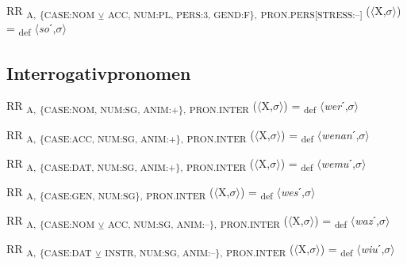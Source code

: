 {\begin{exe}
 RR \textsubscript{A,} \textsubscript{\{CASE:NOM} \textsubscript{${\veebar}$} \textsubscript{ACC, NUM:PL, PERS:3, GEND:F\},} \textsubscript{PRON.PERS[STRESS:–]} ($\langle$X,$\sigma $$\rangle$) = \textsubscript{def} $\langle$\textit{so}ˊ,$\sigma $$\rangle$
\end{exe}

\subsection{Interrogativpronomen}

\begin{exe}
 RR \textsubscript{A,} \textsubscript{\{CASE:NOM, NUM:SG, ANIM:+\},} \textsubscript{PRON.INTER} ($\langle$X,$\sigma $$\rangle$) = \textsubscript{def} $\langle$\textit{wer}ˊ,$\sigma $$\rangle$
\end{exe}

\begin{exe}
 RR \textsubscript{A,} \textsubscript{\{CASE:ACC, NUM:SG, ANIM:+\},} \textsubscript{PRON.INTER} ($\langle$X,$\sigma $$\rangle$) = \textsubscript{def} $\langle$\textit{wenan}ˊ,$\sigma $$\rangle$
\end{exe}

\begin{exe}
 RR \textsubscript{A,} \textsubscript{\{CASE:DAT, NUM:SG, ANIM:+\},} \textsubscript{PRON.INTER} ($\langle$X,$\sigma $$\rangle$) = \textsubscript{def} $\langle$\textit{wemu}ˊ,$\sigma $$\rangle$
\end{exe}

\begin{exe}
 RR \textsubscript{A,} \textsubscript{\{CASE:GEN, NUM:SG\},} \textsubscript{PRON.INTER} ($\langle$X,$\sigma $$\rangle$) = \textsubscript{def} $\langle$\textit{wes}ˊ,$\sigma $$\rangle$
\end{exe}

\begin{exe}
 RR \textsubscript{A,} \textsubscript{\{CASE:NOM} \textsubscript{${\veebar}$} \textsubscript{ACC, NUM:SG, ANIM:–\},} \textsubscript{PRON.INTER} ($\langle$X,$\sigma $$\rangle$) = \textsubscript{def} $\langle$\textit{waz}ˊ,$\sigma $$\rangle$
\end{exe}

\begin{exe}
 RR \textsubscript{A,} \textsubscript{\{CASE:DAT} \textsubscript{${\veebar}$} \textsubscript{INSTR, NUM:SG, ANIM:–\},} \textsubscript{PRON.INTER} ($\langle$X,$\sigma $$\rangle$) = \textsubscript{def} $\langle$\textit{wiu}ˊ,$\sigma $$\rangle$
\end{exe}

}
